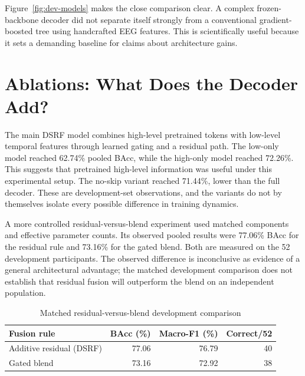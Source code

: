 
Figure~\ref{fig:dev-models} makes the close comparison clear. A complex frozen-backbone decoder did not separate itself strongly from a conventional gradient-boosted tree using handcrafted EEG features. This is scientifically useful because it sets a demanding baseline for claims about architecture gains.

\section{Ablations: What Does the Decoder Add?}
The main DSRF model combines high-level pretrained tokens with low-level temporal features through learned gating and a residual path. The low-only model reached 62.74\% pooled BAcc, while the high-only model reached 72.26\%. This suggests that pretrained high-level information was useful under this experimental setup. The no-skip variant reached 71.44\%, lower than the full decoder. These are development-set observations, and the variants do not by themselves isolate every possible difference in training dynamics.

A more controlled residual-versus-blend experiment used matched components and effective parameter counts. Its observed pooled results were 77.06\% BAcc for the residual rule and 73.16\% for the gated blend. Both are measured on the 52 development participants. The observed difference is inconclusive as evidence of a general architectural advantage; the matched development comparison does not establish that residual fusion will outperform the blend on an independent population.

\begin{table}[htbp]\centering\small
\caption{Matched residual-versus-blend development comparison}\label{tab:skip}
\begin{tabular}{@{}lrrr@{}}\toprule\textbf{Fusion rule}&\textbf{BAcc (\%)}&\textbf{Macro-F1 (\%)}&\textbf{Correct/52}\\\midrule
Additive residual (DSRF)&77.06&76.79&40\\
Gated blend&73.16&72.92&38\\\bottomrule
\end{tabular}\end{table}

